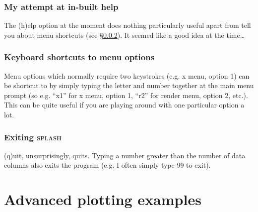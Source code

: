 \documentclass[a4paper,10pt]{article}
\newcommand{\splash}{\textsc{splash }}
\begin{document}
\subsubsection{ My attempt at in-built help}
The (h)elp option at the moment does nothing particularly useful apart from tell you about menu shortcuts (see \S\ref{sec:menushortcuts}). It seemed like a good idea at the time\ldots

\subsubsection{ Keyboard shortcuts to menu options}
\label{sec:menushortcuts}
Menu options which normally require two keystrokes (e.g. x menu, option 1) can be shortcut to by simply typing the letter and number together at the main menu prompt (so e.g. ``x1'' for x menu, option 1, ``r2'' for render menu, option 2, etc.). This can be quite useful if you are playing around with one particular option a lot.

\subsubsection{ Exiting \splash}
 (q)uit, unsurprisingly, quits. Typing a number greater than the number of
data columns also exits the program (e.g. I often simply type 99 to exit).


\section{Advanced plotting examples}
\end{document}
